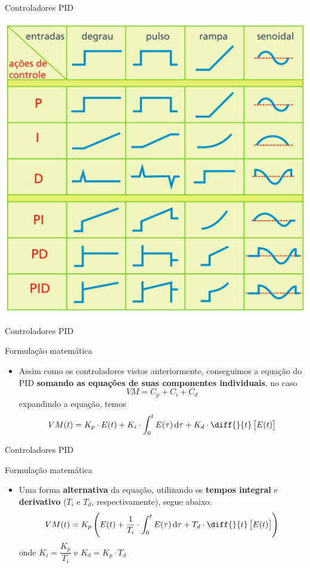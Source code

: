 \begin{frame}{Controladores PID}
	
	\centering
	
	\includegraphics[height=0.9\textheight]{Figuras/Ch13/fig2}
\end{frame}


\begin{frame}{Controladores PID}
	\begin{block}{Formulação matemática}
		\begin{itemize}
			\item Assim como os controladores vistos anteriormente, conseguimos a equação do PID \textbf{somando as equações de suas componentes individuais}, no caso
			\[ VM=C_{p}+C_{i}+C_{d} \]
			expandindo a equação, temos
			\[ VM(t)=K_p\cdot E(t)+K_i\cdot \int_{0}^{t}E(\tau)\dif \tau +K_d\cdot\diff{}{t}\sbr{E(t)} \]
		\end{itemize}
	\end{block}
\end{frame}


\begin{frame}{Controladores PID}
	\begin{block}{Formulação matemática}
		\begin{itemize}
			\item Uma forma \textbf{alternativa} da equação, utilizando os \textbf{tempos integral} e \textbf{derivativo} ($ T_i $ e $ T_d $, respectivamente), segue abaixo:
			\[ VM(t)=K_p\left(E(t)+\dfrac{1}{T_i}\cdot \int_{0}^{t}E(\tau)\dif \tau +T_d\cdot\diff{}{t}\sbr{E(t)} \right) \]
			onde $ K_i=\dfrac{K_p}{T_i} $ e $ K_d=K_p\cdot T_d $
		\end{itemize}
	\end{block}
\end{frame}


